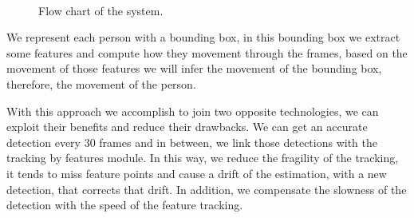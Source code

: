 \begin{figure}[H]
	
\centering

\\


\caption{Flow chart of the system.}
\label{introTracking3}
\end{figure}

We represent each person with a bounding box, in this bounding box we extract some features and compute how they movement through the frames, based on the movement of those features we will infer the movement of the bounding box, therefore, the movement of the person.

With this approach we accomplish to join two opposite technologies, we can exploit their benefits and reduce their drawbacks. We can get an accurate detection every $30$ frames and in between, we link those detections with the tracking by features module. In this way, we reduce the fragility of the tracking, it tends to miss feature points and cause a drift of the estimation, with a new detection, that corrects that drift. In addition, we compensate the slowness of the detection with the speed of the feature tracking.


